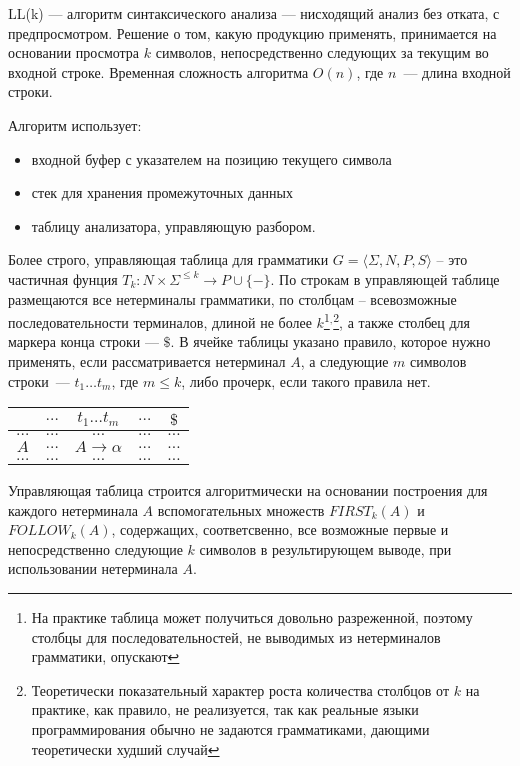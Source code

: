 \documentclass[10pt]{article}         %
\begin{document}
	LL(k) --- алгоритм синтаксического анализа --- нисходящий анализ без отката, с предпросмотром. 
	Решение о том, какую продукцию применять, принимается на основании просмотра $k$ символов, непосредственно следующих за текущим во входной строке. 
	Временная сложность алгоритма $O(n)$, где $n$~--- длина входной строки. 
	
	Алгоритм использует:
	\begin{itemize}
		\item входной буфер с указателем на позицию текущего символа
		\item стек для хранения промежуточных данных
		\item таблицу анализатора, управляющую разбором.
	\end{itemize}
	 Более строго, управляющая таблица для грамматики $G=\langle\Sigma,N,P,S\rangle$ -- это частичная фунция $T_k:N\times{\Sigma^{\leq{k}}}\to{P\cup{\{-\}}}$.
	 По строкам в управляющей таблице размещаются все нетерминалы грамматики, по столбцам -- всевозможные последовательности терминалов, длиной не более $k$\footnote{На практике таблица может получиться довольно разреженной, поэтому столбцы для последовательностей, не выводимых из нетерминалов грамматики, опускают}$^,$\footnote{Теоретически показательный характер роста количества столбцов от $k$ на практике, как правило, не реализуется, так как реальные языки программирования обычно не задаются грамматиками, дающими теоретически худший случай}, а также столбец для маркера конца строки --- $\$$. 
	В ячейке таблицы указано правило, которое нужно применять, если рассматривается нетерминал $A$, а следующие $m$ символов строки~--- $t_{1} \dots t_{m}$, где $m \leq k$, либо прочерк, если такого правила нет. 
	
	
	\begin{center}
		\begin{tabular}{ c | c | c | c | c }
			& $\dots$ & $t_{1} \dots t_{m}$ & $\dots$ & $\$$ \\ \hline  
			$\dots$  & $\dots$ & $\dots$ & $\dots$ & $\dots$ \\ \hline  
			$A$  & $\dots$ & $A \to \alpha$ & $\dots$ & $\dots$ \\ \hline  
			$\dots$  & $\dots$ & $\dots$ & $\dots$ & $\dots$ 
		\end{tabular}  
	\end{center}
	
	Управляющая таблица строится алгоритмически на основании построения для каждого нетерминала $A$ вспомогательных множеств $FIRST_{k}(A)$ и $FOLLOW_{k}(A)$, содержащих, соответсвенно, все возможные первые и непосредственно следующие $k$ символов в результирующем выводе, при использовании нетерминала $A$.
	 
\end{document}
